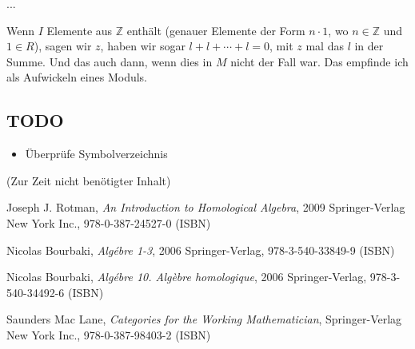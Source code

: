 \documentclass[a4paper]{amsart}
\theoremstyle{definition}
\newcommand{\Z}{\ensuremath{\mathbb{ Z }}}
\begin{document}
...

Wenn $I$ Elemente aus $\Z$ enthält (genauer Elemente der Form $n\cdot 1$, wo $n \in \Z$ und $1 \in R$), sagen wir $z$, haben wir sogar $l + l + \cdots + l = 0$, mit $z$ mal das $l$ in der Summe. Und das auch dann, wenn dies in $M$ nicht der Fall war. Das empfinde ich als Aufwickeln eines Moduls.  




\begin{backup}
\section{TODO}
\begin{itemize}
     \item Überprüfe Symbolverzeichnis
\end{itemize}


\end{backup}

\begin{backup}
    (Zur Zeit nicht benötigter Inhalt)
\end{backup}

\begin{thebibliography}{9}
   	Joseph J. Rotman, \emph{An Introduction to Homological Algebra},
   	2009 Springer-Verlag New York Inc., 978-0-387-24527-0 (ISBN)

      Nicolas Bourbaki, \emph{Algébre 1-3},
      2006 Springer-Verlag, 978-3-540-33849-9 (ISBN)

      Nicolas Bourbaki, \emph{Algébre 10. Algèbre homologique},
      2006 Springer-Verlag, 978-3-540-34492-6 (ISBN)

      Saunders Mac Lane, \emph{Categories for the Working Mathematician},
      Springer-Verlag New York Inc., 978-0-387-98403-2 (ISBN)

\end{thebibliography}
\end{document}
